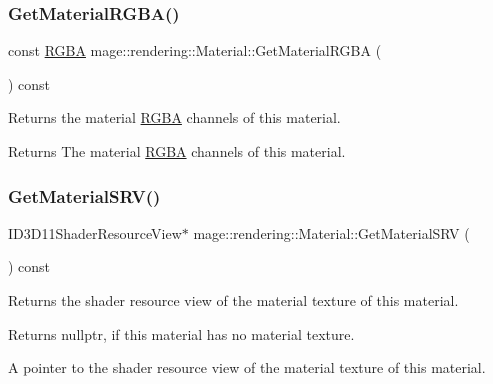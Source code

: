 \subsubsection{\texorpdfstring{Get\+Material\+R\+G\+B\+A()}{GetMaterialRGBA()}}
{\footnotesize\ttfamily const \hyperlink{structmage_1_1_r_g_b_a}{R\+G\+BA} mage\+::rendering\+::\+Material\+::\+Get\+Material\+R\+G\+BA (\begin{DoxyParamCaption}{ }\end{DoxyParamCaption}) const\hspace{0.3cm}{\ttfamily [noexcept]}}

Returns the material \hyperlink{structmage_1_1_r_g_b_a}{R\+G\+BA} channels of this material.

\begin{DoxyReturn}{Returns}
The material \hyperlink{structmage_1_1_r_g_b_a}{R\+G\+BA} channels of this material. 
\end{DoxyReturn}
\hypertarget{classmage_1_1rendering_1_1_material_ae1e1f712801dd1f16a695692df4f4f23}{}\label{classmage_1_1rendering_1_1_material_ae1e1f712801dd1f16a695692df4f4f23} 
\subsubsection{\texorpdfstring{Get\+Material\+S\+R\+V()}{GetMaterialSRV()}}
{\footnotesize\ttfamily I\+D3\+D11\+Shader\+Resource\+View$\ast$ mage\+::rendering\+::\+Material\+::\+Get\+Material\+S\+RV (\begin{DoxyParamCaption}{ }\end{DoxyParamCaption}) const\hspace{0.3cm}{\ttfamily [noexcept]}}

Returns the shader resource view of the material texture of this material.

\begin{DoxyReturn}{Returns}
{\ttfamily nullptr}, if this material has no material texture. 

A pointer to the shader resource view of the material texture of this material. 
\end{DoxyReturn}
\hypertarget{classmage_1_1rendering_1_1_material_aa396990a630c749a46a8a9fc88e80683}{}\label{classmage_1_1rendering_1_1_material_aa396990a630c749a46a8a9fc88e80683} 
